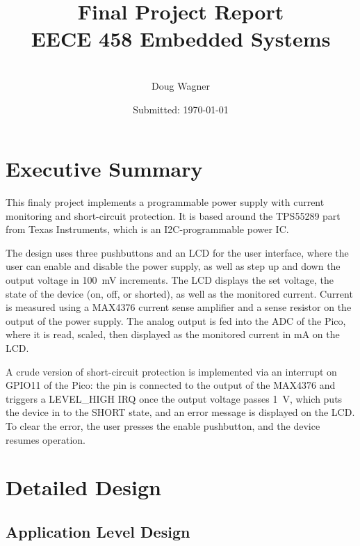 \documentclass[12pt]{article}
\title{Final Project Report \\ EECE 458 Embedded Systems}
\author{\\ Doug Wagner}
\date{Submitted: \today }
\numberwithin{figure}{section}
\numberwithin{equation}{section}
\begin{document}
\maketitle 
\newpage

\tableofcontents 
\newpage 

\section{Executive Summary}

This finaly project implements a programmable power supply with current monitoring and short-circuit protection.  It is based around the TPS55289 part from Texas Instruments, which is an I2C-programmable power IC.  

The design uses three pushbuttons and an LCD for the user interface, where the user can enable and disable the power supply, as well as step up and down the output voltage in \SI{100}{\milli\volt} increments.  The LCD displays the set voltage, the state of the device (on, off, or shorted), as well as the monitored current. Current is measured using a MAX4376 current sense amplifier and a sense resistor on the output of the power supply. The analog output is fed into the ADC of the Pico, where it is read, scaled, then displayed as the monitored current in \si{\milli\ampere} on the LCD.

A crude version of short-circuit protection is implemented via an interrupt on GPIO11 of the Pico: the pin is connected to the output of the MAX4376 and triggers a LEVEL_HIGH IRQ once the output voltage passes \SI{1}{\volt}, which puts the device in to the SHORT state, and an error message is displayed on the LCD.  To clear the error, the user presses the enable pushbutton, and the device resumes operation.

\section{Detailed Design} 
\subsection{Application Level Design}
\end{document}
